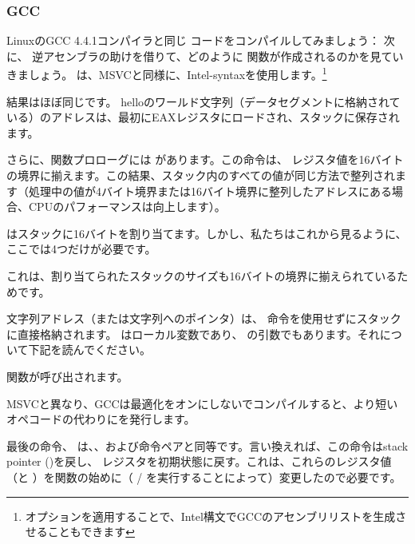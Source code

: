 \subsubsection{GCC}

LinuxのGCC 4.4.1コンパイラと同じ \CCpp コードをコンパイルしてみましょう：
次に、 \IDA 逆アセンブラの助けを借りて、どのように \main 関数が作成されるのかを見ていきましょう。
\IDA は、MSVCと同様に、Intel-syntaxを使用します。\footnote{オプションを適用することで、Intel構文でGCCのアセンブリリストを生成させることもできます}



結果はほぼ同じです。 helloのワールド文字列（データセグメントに格納されている）のアドレスは、最初にEAXレジスタにロードされ、スタックに保存されます。

さらに、関数プロローグには  があります。この命令は、 \ESP レジスタ値を16バイトの境界に揃えます。この結果、スタック内のすべての値が同じ方法で整列されます（処理中の値が4バイト境界または16バイト境界に整列したアドレスにある場合、CPUのパフォーマンスは向上します）。

 はスタックに16バイトを割り当てます。しかし、私たちはこれから見るように、ここでは4つだけが必要です。

これは、割り当てられたスタックのサイズも16バイトの境界に揃えられているためです。

文字列アドレス（または文字列へのポインタ）は、 \PUSH 命令を使用せずにスタックに直接格納されます。  はローカル変数であり、 \printf{} の引数でもあります。それについて下記を読んでください。

\printf 関数が呼び出されます。

MSVCと異なり、GCCは最適化をオンにしないでコンパイルすると、より短いオペコードの代わりにを発行します。

最後の命令、 \LEAVE は、、および命令ペアと同等です。言い換えれば、この命令は\gls{stack pointer} (\ESP)を戻し、 \EBP レジスタを初期状態に戻す。これは、これらのレジスタ値（\ESP と \EBP ）を関数の始めに（ / を実行することによって）変更したので必要です。

